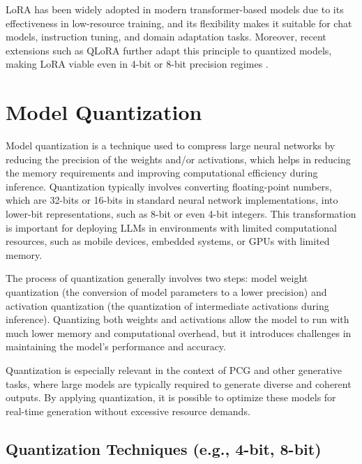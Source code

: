 LoRA has been widely adopted in modern transformer-based models due to its effectiveness
in low-resource training, and its flexibility makes it suitable for chat models,
instruction tuning, and domain adaptation tasks. Moreover, recent extensions such as
QLoRA further adapt this principle to quantized models, making LoRA viable even in
4-bit or 8-bit precision regimes \cite{dettmers2023qlora}.

\section{Model Quantization}

Model quantization is a technique used to compress large neural networks by reducing the
precision of the weights and/or activations, which helps in reducing the memory requirements
and improving computational efficiency during inference. Quantization typically
involves converting floating-point numbers, which are 32-bits or 16-bits in standard neural
network implementations, into lower-bit representations, such as 8-bit or even 4-bit
integers. This transformation is important for deploying LLMs in environments with limited
computational resources, such as mobile devices, embedded systems, or GPUs with
limited memory.

The process of quantization generally involves two steps: model weight quantization
(the conversion of model parameters to a lower precision) and activation quantization (the
quantization of intermediate activations during inference). Quantizing both weights and
activations allow the model to run with much lower memory and computational overhead,
but it introduces challenges in maintaining the model's performance and accuracy.

Quantization is especially relevant in the context of PCG and other generative tasks,
where large models are typically required to generate diverse and coherent outputs. By
applying quantization, it is possible to optimize these models for real-time generation
without excessive resource demands.

\subsection{Quantization Techniques (e.g., 4-bit, 8-bit)}

